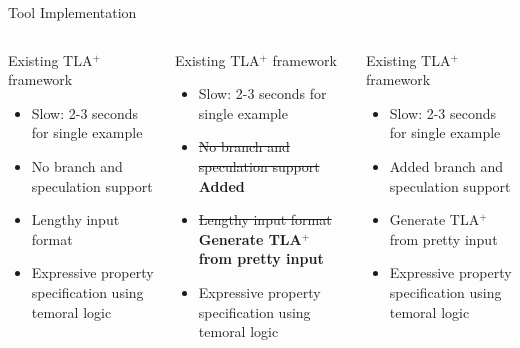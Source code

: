 \documentclass{beamer}
\newcommand{\cmark}{\textcolor{green!70!black}{\ding{51}}} %
\newcommand{\xmark}{\textcolor{red}{\ding{55}}}            %
\begin{document}
\begin{frame}{Tool Implementation}
    \vspace*{-1em}
    \begin{columns}[t]
         {
            \begin{exampleblock}{Existing TLA$^+$ framework}
                \begin{itemize}
                    \item[\xmark] Slow: 2-3 seconds for single example
                    \item[\xmark] No branch and speculation support
                    \item[\xmark] Lengthy input format 
                    \item[\cmark] Expressive property specification using temoral logic
                \end{itemize}
            \end{exampleblock}    
        }

         {
            \begin{exampleblock}{Existing TLA$^+$ framework}
                \begin{itemize}
                    \item[\xmark] Slow: 2-3 seconds for single example
                    \item[\cmark] \st{No branch and speculation support} \textbf{Added}
                    \item[\cmark] \st{Lengthy input format} \textbf{Generate TLA$^+$ from pretty input}
                    \item[\cmark] Expressive property specification using temoral logic
                \end{itemize}
            \end{exampleblock}    
        }

         {
            \begin{exampleblock}{Existing TLA$^+$ framework}
                \begin{itemize}
                    \item[\xmark] Slow: 2-3 seconds for single example
                    \item[\cmark] Added branch and speculation support
                    \item[\cmark] Generate TLA$^+$ from pretty input
                    \item[\cmark] Expressive property specification using temoral logic
                \end{itemize}
            \end{exampleblock}    
        }


\end{columns}
\end{frame}
\end{document}
